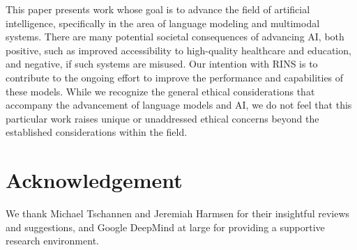 This paper presents work whose goal is to advance the field of artificial intelligence, specifically in the area of language modeling and multimodal systems. There are many potential societal consequences of advancing AI, both positive, such as improved accessibility to high-quality healthcare and education, and negative, if such systems are misused. Our intention with RINS is to contribute to the ongoing effort to improve the performance and capabilities of these models. While we recognize the general ethical considerations that accompany the advancement of language models and AI, we do not feel that this particular work raises unique or unaddressed ethical concerns beyond the established considerations within the field.

\section*{Acknowledgement}
We thank Michael Tschannen and Jeremiah Harmsen for their insightful reviews and suggestions, and Google DeepMind at large for providing a supportive research environment.